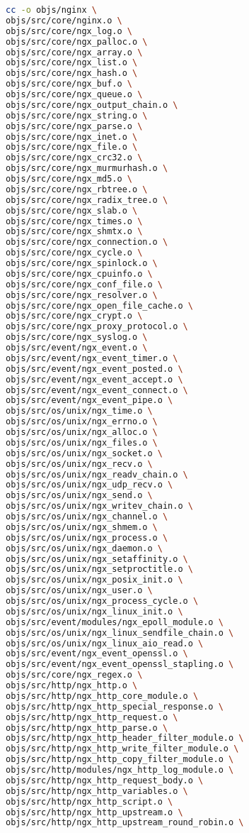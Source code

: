 \begin{lstlisting}[language=bash]
cc -o objs/nginx \
objs/src/core/nginx.o \
objs/src/core/ngx_log.o \
objs/src/core/ngx_palloc.o \
objs/src/core/ngx_array.o \
objs/src/core/ngx_list.o \
objs/src/core/ngx_hash.o \
objs/src/core/ngx_buf.o \
objs/src/core/ngx_queue.o \
objs/src/core/ngx_output_chain.o \
objs/src/core/ngx_string.o \
objs/src/core/ngx_parse.o \
objs/src/core/ngx_inet.o \
objs/src/core/ngx_file.o \
objs/src/core/ngx_crc32.o \
objs/src/core/ngx_murmurhash.o \
objs/src/core/ngx_md5.o \
objs/src/core/ngx_rbtree.o \
objs/src/core/ngx_radix_tree.o \
objs/src/core/ngx_slab.o \
objs/src/core/ngx_times.o \
objs/src/core/ngx_shmtx.o \
objs/src/core/ngx_connection.o \
objs/src/core/ngx_cycle.o \
objs/src/core/ngx_spinlock.o \
objs/src/core/ngx_cpuinfo.o \
objs/src/core/ngx_conf_file.o \
objs/src/core/ngx_resolver.o \
objs/src/core/ngx_open_file_cache.o \
objs/src/core/ngx_crypt.o \
objs/src/core/ngx_proxy_protocol.o \
objs/src/core/ngx_syslog.o \
objs/src/event/ngx_event.o \
objs/src/event/ngx_event_timer.o \
objs/src/event/ngx_event_posted.o \
objs/src/event/ngx_event_accept.o \
objs/src/event/ngx_event_connect.o \
objs/src/event/ngx_event_pipe.o \
objs/src/os/unix/ngx_time.o \
objs/src/os/unix/ngx_errno.o \
objs/src/os/unix/ngx_alloc.o \
objs/src/os/unix/ngx_files.o \
objs/src/os/unix/ngx_socket.o \
objs/src/os/unix/ngx_recv.o \
objs/src/os/unix/ngx_readv_chain.o \
objs/src/os/unix/ngx_udp_recv.o \
objs/src/os/unix/ngx_send.o \
objs/src/os/unix/ngx_writev_chain.o \
objs/src/os/unix/ngx_channel.o \
objs/src/os/unix/ngx_shmem.o \
objs/src/os/unix/ngx_process.o \
objs/src/os/unix/ngx_daemon.o \
objs/src/os/unix/ngx_setaffinity.o \
objs/src/os/unix/ngx_setproctitle.o \
objs/src/os/unix/ngx_posix_init.o \
objs/src/os/unix/ngx_user.o \
objs/src/os/unix/ngx_process_cycle.o \
objs/src/os/unix/ngx_linux_init.o \
objs/src/event/modules/ngx_epoll_module.o \
objs/src/os/unix/ngx_linux_sendfile_chain.o \
objs/src/os/unix/ngx_linux_aio_read.o \
objs/src/event/ngx_event_openssl.o \
objs/src/event/ngx_event_openssl_stapling.o \
objs/src/core/ngx_regex.o \
objs/src/http/ngx_http.o \
objs/src/http/ngx_http_core_module.o \
objs/src/http/ngx_http_special_response.o \
objs/src/http/ngx_http_request.o \
objs/src/http/ngx_http_parse.o \
objs/src/http/ngx_http_header_filter_module.o \
objs/src/http/ngx_http_write_filter_module.o \
objs/src/http/ngx_http_copy_filter_module.o \
objs/src/http/modules/ngx_http_log_module.o \
objs/src/http/ngx_http_request_body.o \
objs/src/http/ngx_http_variables.o \
objs/src/http/ngx_http_script.o \
objs/src/http/ngx_http_upstream.o \
objs/src/http/ngx_http_upstream_round_robin.o \

\end{lstlisting}
